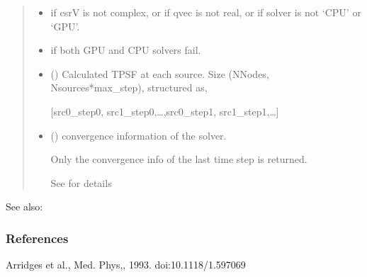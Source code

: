 \documentclass[letterpaper,10pt,english]{sphinxmanual}
\begin{document}
\begin{fulllineitems}
\begin{quote}
\begin{description}
\begin{itemize}
\end{itemize}

\begin{itemize}
\item {} 
\sphinxAtStartPar
{} \textendash{} if csrV is not complex, or if qvec is not real, or if solver is not ‘CPU’ or ‘GPU’.

\item {} 
\sphinxAtStartPar
{} \textendash{} if both GPU and CPU solvers fail.

\end{itemize}

\sphinxAtStartPar
\begin{itemize}
\item {} 
\sphinxAtStartPar
{} () \textendash{} Calculated TPSF at each source. Size (NNodes, Nsources*max\_step), structured as,

\sphinxAtStartPar
{[}src0\_step0, src1\_step0,…,src0\_step1, src1\_step1,…{]}

\item {} 
\sphinxAtStartPar
{} () \textendash{} convergence information of the solver.

\sphinxAtStartPar
Only the convergence info of the last time step is returned.

\sphinxAtStartPar
See {\hyperref[\detokenize{_autosummary/nirfasterff.utils.ConvergenceInfo:nirfasterff.utils.ConvergenceInfo}]{}} for details

\end{itemize}


\end{description}\end{quote}


\begin{sphinxseealso}{See also:}

\sphinxAtStartPar
{\hyperref[\detokenize{_autosummary/nirfasterff.math.gen_mass_matrix:nirfasterff.math.gen_mass_matrix}]{}}


\end{sphinxseealso}

\subsubsection*{References}

\sphinxAtStartPar
Arridges et al., Med. Phys,, 1993. doi:10.1118/1.597069

\end{fulllineitems}
\end{document}
